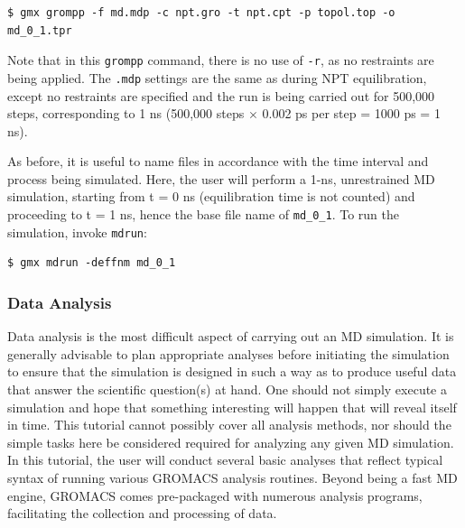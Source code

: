 \documentclass[9pt,tutorial,pubversion]{livecoms}
\begin{document}
\begin{lstlisting}
$ gmx grompp -f md.mdp -c npt.gro -t npt.cpt -p topol.top -o md_0_1.tpr
\end{lstlisting}

Note that in this \texttt{grompp} command, there is no use of \texttt{-r}, as no restraints are being applied. The \texttt{.mdp} settings are the same as during NPT equilibration, except no restraints are specified and the run is being carried out for 500,000 steps, corresponding to 1 ns (500,000 steps $\times$ 0.002 ps per step = 1000 ps = 1 ns).

As before, it is useful to name files in accordance with the time interval and process being simulated. Here, the user will perform a 1-ns, unrestrained MD simulation, starting from t = 0 ns (equilibration time is not counted) and proceeding to t = 1 ns, hence the base file name of \texttt{md\_0\_1}. To run the simulation, invoke \texttt{mdrun}:

\begin{lstlisting}
$ gmx mdrun -deffnm md_0_1
\end{lstlisting}

\subsubsection{Data Analysis} \label{lyso_ana}

Data analysis is the most difficult aspect of carrying out an MD simulation. It is generally advisable to plan appropriate analyses before initiating the simulation to ensure that the simulation is designed in such a way as to produce useful data that answer the scientific question(s) at hand. One should not simply execute a simulation and hope that something interesting will happen that will reveal itself in time. This tutorial cannot possibly cover all analysis methods, nor should the simple tasks here be considered required for analyzing any given MD simulation. In this tutorial, the user will conduct several basic analyses that reflect typical syntax of running various GROMACS analysis routines. Beyond being a fast MD engine, GROMACS comes pre-packaged with numerous analysis programs, facilitating the collection and processing of data.
\end{document}
